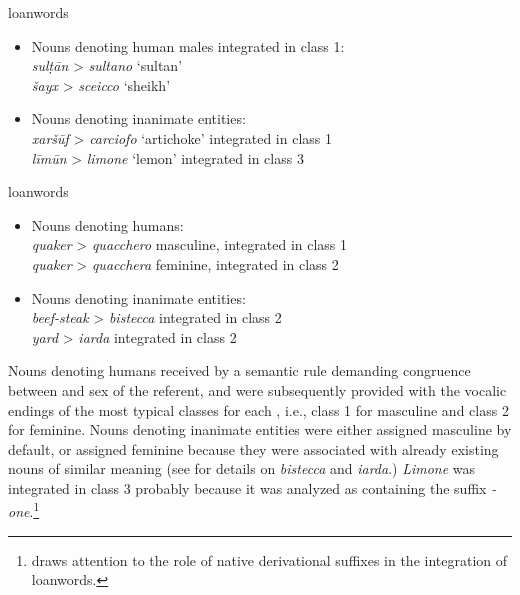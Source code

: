 \documentclass[output=paper,colorlinks,citecolor=brown]{langscibook}
\begin{document}
\begin{exe}
	\ex \label{10ex8}
	\begin{xlist}
		\ex {} loanwords
		
		\begin{itemize}
			\item Nouns denoting human males integrated in class 1:\\
			\emph{sulṭān} > \emph{sultano} ‘sultan’\\
			\emph{šayx} > \emph{sceicco} ‘sheikh’
			
			\item Nouns denoting inanimate entities:\\
			\emph{xaršūf} > \emph{carciofo} ‘artichoke’ \hfill integrated in class 1\\
			\emph{līmūn} > \emph{limone} ‘lemon’ \hfill integrated in class 3
		\end{itemize}
		
		\ex {} loanwords
		
		\begin{itemize}
			\item Nouns denoting humans: \\
			\emph{quaker} > \emph{quacchero} \hfill masculine, integrated in class 1\\
			\emph{quaker} > \emph{quacchera} \hfill feminine, integrated in class 2
			
			\item Nouns denoting inanimate entities:\\
			\emph{beef-steak} > \emph{bistecca} \hfill integrated in class 2 \\
			\emph{yard} > \emph{iarda} \hfill integrated in class 2
		\end{itemize}
		
	\end{xlist}
\end{exe}

Nouns denoting humans received  by a semantic rule demanding congruence between  and sex of the referent, and were subsequently provided with the vocalic endings of the most typical classes for each , i.e., class 1 for masculine and class 2 for feminine. Nouns denoting inanimate entities were either assigned masculine  by default, or assigned feminine  because they were associated with already existing nouns of similar meaning (see \citealt[72--73]{thornton2003} for details on \emph{bistecca} and \emph{iarda}.) \emph{Limone} was integrated in class 3 probably because it was analyzed as containing the suffix \emph{-one}.\footnote{\citet[43--45]{gardani2013} draws attention to the role of native derivational suffixes in the integration of loanwords.}
\end{document}
